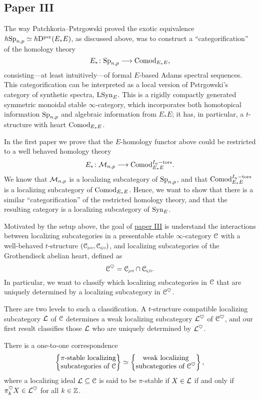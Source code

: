 \subsection{Paper III}

The way Patchkoria--Pstr\a{}gowski proved the exotic equivalence $h\mathrm{Sp}_{n,p} \simeq h\mathrm{D}^{\mathrm{per}}(E_*E)$, as discussed above, was to construct a ``categorification'' of the homology theory 
\[E_* \colon \mathrm{Sp}_{n,p} \longrightarrow \mathrm{Comod}_{E_*E},\]
consisting---at least intuitively---of formal $E$-based Adams spectral sequences. This categorification can be interpreted as a local version of Pstr\a{}gowski's category of synthetic spectra, $\mathrm{LSyn}_{E}$. This is a rigidly compactly generated symmetric monoidal stable $\infty$-category, which incorporates both homotopical information $\mathrm{Sp}_{n,p}$ and algebraic information from $E_*E$; it has, in particular, a $t$-structure with heart $\mathrm{Comod}_{E_*E}$. 

In the first paper we prove that the $E$-homology functor above could be restricted to a well behaved homology theory 
\[E_* \colon \mathcal{M}_{n,p} \longrightarrow \mathrm{Comod}_{E_*E}^{I_n-\mathrm{tors}}.\]
We know that $\mathcal{M}_{n,p}$ is a localizing subcategory of $\mathrm{Sp}_{n,p}$, and that $\mathrm{Comod}_{E_*E}^{I_n-\mathrm{tors}}$ is a localizing subcategory of $\mathrm{Comod}_{E_*E}$. Hence, we want to show that there is a similar ``categorification'' of the restricted homology theory, and that the resulting category is a localizing subcategory of $\mathrm{Syn}_{E}$.  

Motivated by the setup above, the goal of \hyperref[ch3]{paper III} is understand the interactions between localizing subcategories in a presentable stable $\infty$-category $\EuScript{C}$ with a well-behaved $t$-structure $(\EuScript{C}_{\hspace{-1pt}\scriptscriptstyle\geqslant 0}, \EuScript{C}_{\hspace{-1pt}\scriptscriptstyle\leqslant 0})$, and localizing subcategories of the Grothendieck abelian heart, defined as 
\[\EuScript{C}^\heartsuit = \EuScript{C}_{\hspace{-1pt}\scriptscriptstyle\geqslant 0}\cap \EuScript{C}_{\hspace{-1pt}\scriptscriptstyle\leqslant 0}.\] 
In particular, we want to classify which localizing subcategories in $\EuScript{C}$ that are uniquely determined by a localizing subcategory in $\EuScript{C}^\heartsuit$. 

There are two levels to such a classification. A $t$-structure compatible localizing subcategory $\mathcal{L}$ of $\EuScript{C}$ determines a weak localizing subcategory $\mathcal{L}^\heartsuit$ of $\EuScript{C}^\heartsuit$, and our first result classifies those $\mathcal{L}$ who are uniquely determined by $\mathcal{L}^\heartsuit$. 

\begin{theorem}
    There is a one-to-one correspondence
    \[\left\{ \begin{matrix} \pi\text{-stable localizing}\\ \text{subcategories of }\EuScript{C} \end{matrix} \right\} \simeq \left\{ \begin{matrix} \text{weak localizing}\\ \text{subcategories of }\EuScript{C}^\heartsuit \end{matrix} \right\},\]
    where a localizing ideal $\mathcal{L}\subseteq \EuScript{C}$ is said to be $\pi$-stable if $X\in \mathcal{L}$ if and only if $\pi_k^\heartsuit X \in \mathcal{L}^\heartsuit$ for all $k\in \mathbb{Z}$.  
\end{theorem}

